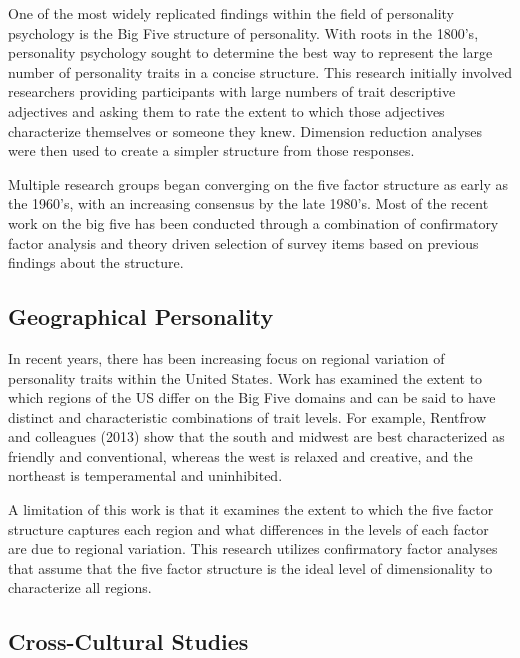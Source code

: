 \documentclass[
]{article}
\begin{document}
One of the most widely replicated findings within the field of personality psychology is the Big Five structure of personality. With roots in the 1800's, personality psychology sought to determine the best way to represent the large number of personality traits in a concise structure. This research initially involved researchers providing participants with large numbers of trait descriptive adjectives and asking them to rate the extent to which those adjectives characterize themselves or someone they knew. Dimension reduction analyses were then used to create a simpler structure from those responses.

Multiple research groups began converging on the five factor structure as early as the 1960's, with an increasing consensus by the late 1980's. Most of the recent work on the big five has been conducted through a combination of confirmatory factor analysis and theory driven selection of survey items based on previous findings about the structure.

\hypertarget{geographical-personality}{%
\subsection{Geographical Personality}\label{geographical-personality}}

In recent years, there has been increasing focus on regional variation of personality traits within the United States. Work has examined the extent to which regions of the US differ on the Big Five domains and can be said to have distinct and characteristic combinations of trait levels. For example, Rentfrow and colleagues (2013) show that the south and midwest are best characterized as friendly and conventional, whereas the west is relaxed and creative, and the northeast is temperamental and uninhibited.

A limitation of this work is that it examines the extent to which the five factor structure captures each region and what differences in the levels of each factor are due to regional variation. This research utilizes confirmatory factor analyses that assume that the five factor structure is the ideal level of dimensionality to characterize all regions.

\hypertarget{cross-cultural-studies}{%
\subsection{Cross-Cultural Studies}\label{cross-cultural-studies}}
\end{document}
